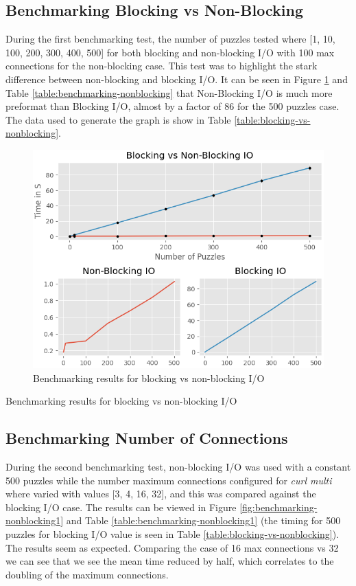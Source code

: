\documentclass[12pt]{article}
\begin{document}
\subsection{Benchmarking Blocking vs Non-Blocking}
During the first benchmarking test, the number of puzzles tested where [1, 10, 100, 200, 300, 400, 500] for both blocking and non-blocking I/O with 100 max connections for the non-blocking case. This test was to highlight the stark difference between non-blocking and blocking I/O. It can be seen in Figure \ref*{fig:Benchmarking} and Table \ref*{table:benchmarking-nonblocking} that Non-Blocking I/O is much more preformat than Blocking I/O, almost by a factor of 86 for the 500 puzzles case. The data used to generate the graph is show in Table \ref*{table:blocking-vs-nonblocking}.

\begin{figure}[!h]
    \centering
    \includegraphics[width=0.6\linewidth]{../plot/graph.png}
    \caption{Benchmarking results for blocking vs non-blocking I/O}
    \label{fig:Benchmarking}
\end{figure}

\begin{table}
    \centering
    \caption{Benchmarking results for blocking vs non-blocking I/O}
    \label{table:blocking-vs-nonblocking}
\end{table}

\subsection{Benchmarking Number of Connections}

During the second benchmarking test, non-blocking I/O was used with a constant 500 puzzles while the number maximum connections configured for \textit{curl multi} where varied with values [3, 4, 16, 32], and this was compared against the blocking I/O case. The results can be viewed in Figure \ref*{fig:benchmarking-nonblocking1} and Table \ref*{table:benchmarking-nonblocking1} (the timing for 500 puzzles for blocking I/O value is seen in Table \ref*{table:blocking-vs-nonblocking}). The results seem as expected. Comparing the case of 16 max connections vs 32 we can see that we see the mean time reduced by half, which correlates to the doubling of the maximum connections.
\end{document}
